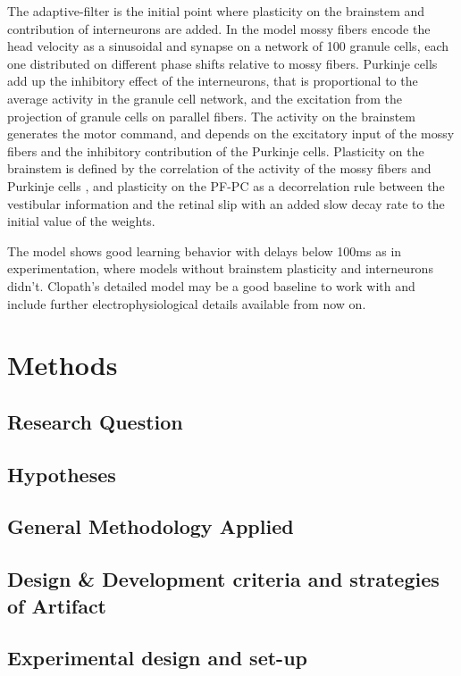 \documentclass[12pt, a4paper,twoside]{tesi_upf}
\begin{document}
The adaptive-filter is the initial point where plasticity on the brainstem and contribution of interneurons are added. In the model mossy fibers encode the head velocity as a sinusoidal \cite{Manuscript2009} and synapse on a network of 100 granule cells, each one distributed on different phase shifts relative to mossy fibers. Purkinje cells add up the inhibitory effect of the interneurons, that is proportional to the average activity in the granule cell network, and the excitation from the projection of granule cells on parallel fibers. The activity on the brainstem generates the motor command, and depends on the excitatory input of the mossy fibers and the inhibitory contribution of the Purkinje cells. Plasticity on the brainstem is defined by the correlation of the activity of the mossy fibers and Purkinje cells \cite{Menzies2010}, and plasticity on the PF-PC as a decorrelation rule between the vestibular information and the retinal slip \cite{Dean2002} with an added slow decay rate to the initial value of the weights.

The model shows good learning behavior with delays below 100ms as in experimentation, where models without brainstem plasticity and interneurons didn't. Clopath's detailed model may be a good baseline to work with and include further electrophysiological details available from now on.

\chapter{Methods}

\section{Research Question}

\section{Hypotheses}

\section{General Methodology Applied}

\section{Design \& Development criteria and strategies of Artifact}

\section{Experimental design and set-up}
\end{document}
